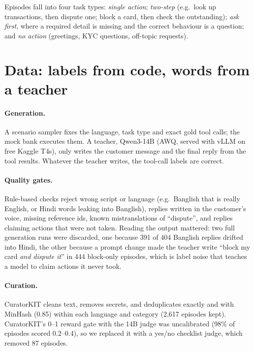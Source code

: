 \documentclass[11pt]{article}
\begin{document}
Episodes fall into four task types: \emph{single action}; \emph{two-step} (e.g.\ look up transactions, then dispute
one; block a card, then check the outstanding); \emph{ask first}, where a required detail is missing and the correct
behaviour is a question; and \emph{no action} (greetings, KYC questions, off-topic requests).

\section{Data: labels from code, words from a teacher}
\label{sec:data}

\paragraph{Generation.} A scenario sampler fixes the language, task type and exact gold tool calls; the mock bank
executes them. A teacher, Qwen3-14B \citep{yang2025qwen3} (AWQ, served with vLLM \citep{kwon2023vllm} on free Kaggle
T4s), only writes the customer message and the final reply from the tool results. Whatever the teacher writes, the
tool-call labels are correct.

\paragraph{Quality gates.} Rule-based checks reject wrong script or language (e.g.\ Banglish that is really English,
or Hindi words leaking into Banglish), replies written in the customer's voice, missing reference ids, known
mistranslations of ``dispute'', and replies claiming actions that were not taken. Reading the output mattered: two
full generation runs were discarded, one because 391 of 404 Banglish replies drifted into Hindi, the other because a
prompt change made the teacher write ``block my card \emph{and dispute it}'' in 444 block-only episodes, which is label
noise that teaches a model to claim actions it never took.

\paragraph{Curation.} CuratorKIT cleans text, removes secrets, and deduplicates exactly and with MinHash (0.85) within
each language and category (2,617 episodes kept). CuratorKIT's 0--1 reward gate with the 14B judge was uncalibrated
(98\% of episodes scored 0.2--0.4), so we replaced it with a yes/no checklist judge, which removed 87 episodes.
\end{document}
